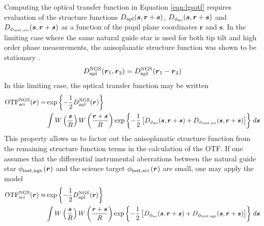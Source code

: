 Computing the optical transfer function in Equation \ref{eqn:lgsotf}
requires evaluation of the structure functions $D_{\rm
  apl}(\boldsymbol{s},\boldsymbol{r} + \boldsymbol{s})$, $D_{\rm
  \phi_{ao}}(\boldsymbol{s},\boldsymbol{r} + \boldsymbol{s})$ and
$D_{\rm \phi_{inst,sci}}(\boldsymbol{s},\boldsymbol{r} + \boldsymbol{s})$ as
a function of the pupil plane coordinates $\boldsymbol{r}$ and
$\boldsymbol{s}$.  In the limiting case where the same natural
guide star is used for both tip tilt and high order phase
measurements, the anisoplanatic structure function was shown to be 
stationary \cite{Britton:2006}.
\begin{equation}
D^{\rm NGS}_{\rm apl}(\boldsymbol{r}_{1},\boldsymbol{r}_{2}) = 
D^{\rm NGS}_{\rm apl}(\boldsymbol{r}_{1} - \boldsymbol{r}_{2}) 
\end{equation}
In this limiting case, the optical transfer function may be written 
\begin{equation}\label{eqn:ngsotf}
\begin{aligned}
{\rm OTF}^{\rm NGS}_{\rm sci}(\boldsymbol{r}) = 
& \exp{ \left\{ -\frac{1}{2}  D^{\rm NGS}_{\rm apl}(\boldsymbol{r}) \right\} }  \\
& \int 
W \left( \frac{\boldsymbol{s}}{R} \right)
W \left( \frac{\boldsymbol{r}+\boldsymbol{s}}{R} \right) 
\exp{ \left\{ -\frac{1}{2} 
\left[
D_{\rm \phi_{ao}}(\boldsymbol{s}, \boldsymbol{r} + \boldsymbol{s}) + 
D_{\rm \phi_{inst,sci}}(\boldsymbol{s}, \boldsymbol{r} + \boldsymbol{s}) 
\right] \right\} }
\; d\boldsymbol{s}
\end{aligned}
\end{equation}
This property allows us to factor out the anisoplanatic structure function
from the remaining structure function terms in the calculation of the
OTF.  If one assumes that the differential
instrumental aberrations between the natural guide star $\phi_{\rm inst,
  ngs}\left(\boldsymbol{r}\right)$ and the science target $\phi_{\rm
  inst,sci}\left(\boldsymbol{r}\right)$ are small, one may apply the
model
\begin{equation}\label{eqn:ngsapproxotf}
\begin{aligned}
{\rm OTF}^{\rm NGS}_{\rm sci}(\boldsymbol{r}) \approx
& \exp{ \left\{ -\frac{1}{2} D^{\rm NGS}_{\rm apl}(\boldsymbol{r}) \right\} }  \\
& \int 
W \left( \frac{\boldsymbol{s}}{R} \right)
W \left( \frac{\boldsymbol{r} + \boldsymbol{s}}{R} \right) 
\exp{ \left\{ -\frac{1}{2} \left[
D_{\rm \phi_{ao}}(\boldsymbol{s}, \boldsymbol{r} + \boldsymbol{s}) + 
D_{\rm \phi_{inst,ngs}}(\boldsymbol{s}, \boldsymbol{r} + \boldsymbol{s})
\right] \right\} }
\; d\boldsymbol{s}
\end{aligned}
\end{equation}
